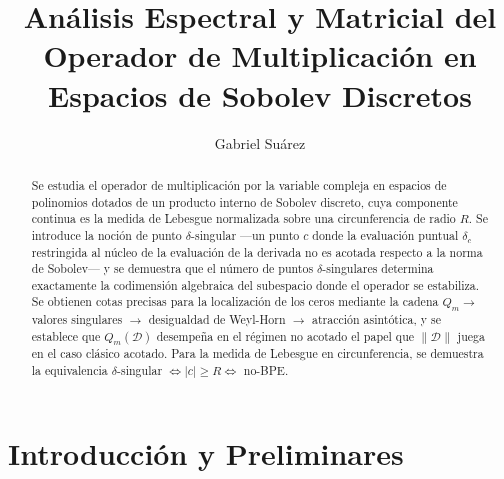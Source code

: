 \documentclass[12pt,a4paper]{article}
\theoremstyle{definition}
\theoremstyle{remark}
\newcommand{\D}{\mathcal{D}}
\begin{document}
\title{Análisis Espectral y Matricial del Operador de Multiplicación en Espacios de Sobolev Discretos}
\author{Gabriel Suárez}
\maketitle


\begin{abstract}
  Se estudia el operador de multiplicación por la variable compleja en espacios de polinomios dotados de un producto interno de Sobolev discreto, cuya componente continua es la medida de Lebesgue normalizada sobre una circunferencia de radio $R$. Se introduce la noción de punto $\delta$-singular ---un punto $c$ donde la evaluación puntual $\delta_c$ restringida al núcleo de la evaluación de la derivada no es acotada respecto a la norma de Sobolev--- y se demuestra que el número de puntos $\delta$-singulares determina exactamente la codimensión algebraica del subespacio donde el operador se estabiliza. Se obtienen cotas precisas para la localización de los ceros mediante la cadena $Q_m \to$ valores singulares $\to$ desigualdad de Weyl-Horn $\to$ atracción asintótica, y se establece que $Q_m(\D)$ desempeña en el régimen no acotado el papel que $\|\D\|$ juega en el caso clásico acotado. Para la medida de Lebesgue en circunferencia, se demuestra la equivalencia $\delta$-singular $\iff |c|\ge R \iff$ no-BPE.
\end{abstract}

\newpage
\tableofcontents
\newpage

\section{Introducción y Preliminares}\label{sec:intro}
\end{document}
